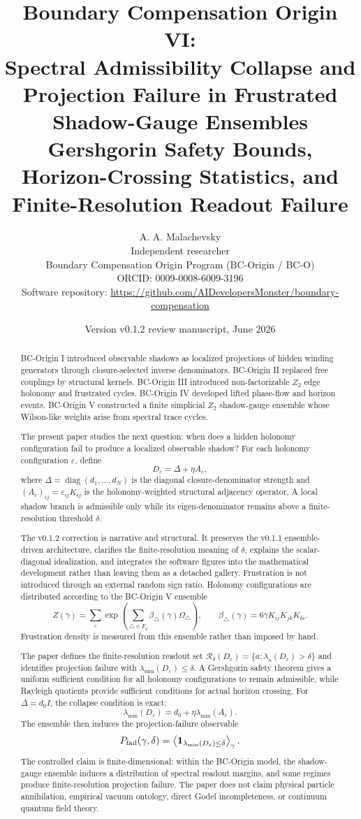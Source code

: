 \documentclass[11pt]{article}
\title{Boundary Compensation Origin VI:\\ Spectral Admissibility Collapse and Projection Failure in Frustrated Shadow-Gauge Ensembles\\[0.35em]\large Gershgorin Safety Bounds, Horizon-Crossing Statistics, and Finite-Resolution Readout Failure}
\author{A. A. Malachevsky\\Independent researcher\\Boundary Compensation Origin Program (BC-Origin / BC-O)\\ORCID: 0009-0008-6009-3196\\Software repository: \url{https://github.com/AIDevelopersMonster/boundary-compensation}}
\date{Version v0.1.2 review manuscript, June 2026}
\newcommand{\eps}{\varepsilon}
\newcommand{\Rread}{\mathcal R}
\begin{document}
\maketitle

\begin{abstract}
BC-Origin I introduced observable shadows as localized projections of hidden winding generators through closure-selected inverse denominators. BC-Origin II replaced free couplings by structural kernels. BC-Origin III introduced non-factorizable $Z_2$ edge holonomy and frustrated cycles. BC-Origin IV developed lifted phase-flow and horizon events. BC-Origin V constructed a finite simplicial $Z_2$ shadow-gauge ensemble whose Wilson-like weights arise from spectral trace cycles.

The present paper studies the next question: when does a hidden holonomy configuration fail to produce a localized observable shadow? For each holonomy configuration $\eps$, define
\[
D_\eps=\Delta+\eta A_\eps,
\]
where $\Delta=\operatorname{diag}(d_1,\ldots,d_N)$ is the diagonal closure-denominator strength and $(A_\eps)_{ij}=\eps_{ij}K_{ij}$ is the holonomy-weighted structural adjacency operator. A local shadow branch is admissible only while its eigen-denominator remains above a finite-resolution threshold $\delta$.

The v0.1.2 correction is narrative and structural. It preserves the v0.1.1 ensemble-driven architecture, clarifies the finite-resolution meaning of $\delta$, explains the scalar-diagonal idealization, and integrates the software figures into the mathematical development rather than leaving them as a detached gallery. Frustration is not introduced through an external random sign ratio. Holonomy configurations are distributed according to the BC-Origin V ensemble
\[
Z(\gamma)=\sum_\eps \exp\left(\sum_{\triangle\in F_2}\beta_\triangle(\gamma)\Omega_\triangle\right),
\qquad
\beta_\triangle(\gamma)=6\gamma K_{ij}K_{jk}K_{ki}.
\]
Frustration density is measured from this ensemble rather than imposed by hand.

The paper defines the finite-resolution readout set $\Rread_\delta(D_\eps)=\{a: \lambda_a(D_\eps)>\delta\}$ and identifies projection failure with $\lambda_{\min}(D_\eps)\le\delta$. A Gershgorin safety theorem gives a uniform sufficient condition for all holonomy configurations to remain admissible, while Rayleigh quotients provide sufficient conditions for actual horizon crossing. For $\Delta=d_0I$, the collapse condition is exact:
\[
\lambda_{\min}(D_\eps)=d_0+\eta\lambda_{\min}(A_\eps).
\]
The ensemble then induces the projection-failure observable
\[
P_{\rm fail}(\gamma,\delta)=\left\langle\mathbf 1_{\lambda_{\min}(D_\eps)\le\delta}\right\rangle_\gamma.
\]
The controlled claim is finite-dimensional: within the BC-Origin model, the shadow-gauge ensemble induces a distribution of spectral readout margins, and some regimes produce finite-resolution projection failure. The paper does not claim physical particle annihilation, empirical vacuum ontology, direct Godel incompleteness, or continuum quantum field theory.
\end{abstract}
\end{document}
